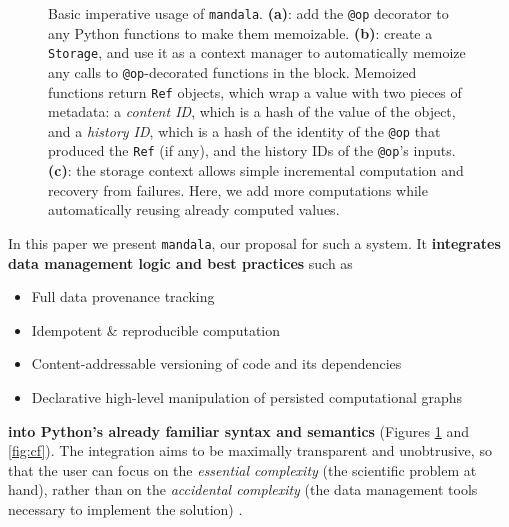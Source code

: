 \documentclass{article} %
\begin{document}
\begin{figure}[h]
\begin{subfigure}{0.4\textwidth}
\caption{}
\end{subfigure}
\caption{Basic imperative usage of \texttt{mandala}. \textbf{(a)}: add the \texttt{@op}
decorator to any Python functions to make them memoizable. \textbf{(b)}:
create a \texttt{Storage}, and use it as a context manager to automatically
memoize any calls to \texttt{@op}-decorated functions in the block. Memoized
functions return \texttt{Ref} objects, which wrap a value with two pieces of
metadata: a \emph{content ID}, which is a hash of the value of the
object, and a \emph{history ID}, which is a hash of the identity of the
\texttt{@op} that produced the \texttt{Ref} (if any), and the history IDs of the
\texttt{@op}'s inputs. \textbf{(c)}: the storage context allows simple
incremental computation and recovery from failures. Here, we add more
computations while automatically reusing already computed values.}
\label{fig:basic-usage}
\end{figure}

In this paper we present \texttt{mandala}, our proposal for such a system. It \textbf{integrates data management logic and best practices} such as
\begin{itemize}
\item Full data provenance tracking
\item Idempotent \& reproducible computation
\item Content-addressable versioning of code and its dependencies
\item Declarative high-level manipulation of persisted computational graphs
\end{itemize}
\textbf{into Python's already familiar syntax and semantics} (Figures
\ref{fig:basic-usage} and \ref{fig:cf}). The integration aims to be maximally
transparent and unobtrusive, so that the user can focus on the \emph{essential
complexity} (the scientific problem at hand), rather than on the
\emph{accidental complexity} (the data management tools necessary to implement the solution) \citep{Brooks1987NoSB}.
\end{document}
